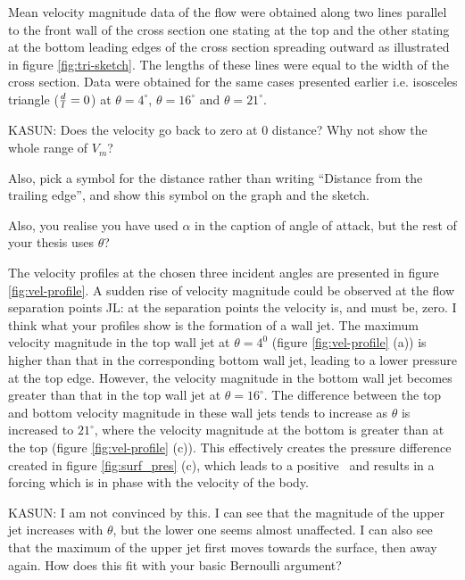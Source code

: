 
   
Mean velocity magnitude data of the flow were obtained along two lines parallel to the front wall of the cross section one stating at the top and the other stating at the bottom leading edges of the cross section spreading outward as illustrated in figure \ref{fig:tri-sketch}. The lengths of these lines were equal to the width of the cross section. Data were obtained for the same cases presented earlier i.e. isosceles triangle ($\frac{d}{l}=0$) at $\theta=4^{\circ}$, $\theta=16^{\circ}$ and $\theta=21^{\circ}$.
       


KASUN: Does the velocity go back to zero at 0 distance? Why not show
the whole range of $V_m$?

Also, pick a symbol for the distance rather than writing ``Distance
from the trailing edge'', and show this symbol on the graph and the
sketch.

Also, you realise you have used $\alpha$ in the caption of angle of
attack, but the rest of your thesis uses $\theta$?

The velocity profiles at the chosen three incident angles are presented in figure \ref{fig:vel-profile}. A sudden rise of velocity magnitude could be observed at the flow separation points JL: at the separation points the velocity is, and must be, zero. I think what your profiles show is the formation of a wall jet. The maximum velocity magnitude in the top wall jet at $\theta= 4^{0}$ (figure \ref{fig:vel-profile} (a)) is higher than that in the corresponding bottom wall jet, leading to a lower pressure at the top edge. However, the velocity magnitude in the bottom wall jet becomes greater than that in the top wall jet at $\theta=16^{\circ}$. The difference between the top and bottom velocity magnitude in these wall jets tends to increase as $\theta$ is increased to $21^{\circ}$, where the velocity magnitude at the bottom is greater than at the top (figure \ref{fig:vel-profile} (c)). This effectively creates the pressure difference created in figure \ref{fig:surf_pres} (c), which leads to a positive \cy\ and results in a forcing which is in phase with the velocity of the body. 

KASUN: I am not convinced by this. I can see that the magnitude of the upper jet increases with $\theta$, but the lower one seems almost unaffected. I can also see that the maximum of the upper jet first moves towards the surface, then away again. How does this fit with your basic Bernoulli argument?

